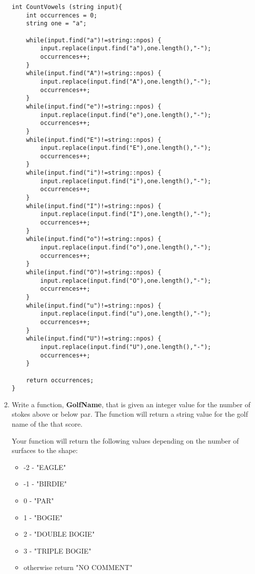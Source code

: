 \documentclass{article}
\begin{document}
\begin{enumerate}
\begin{lstlisting}
int CountVowels (string input){
    int occurrences = 0;
    string one = "a";

    while(input.find("a")!=string::npos) {
        input.replace(input.find("a"),one.length(),"-");
        occurrences++;
    }
    while(input.find("A")!=string::npos) {
        input.replace(input.find("A"),one.length(),"-");
        occurrences++;
    }
    while(input.find("e")!=string::npos) {
        input.replace(input.find("e"),one.length(),"-");
        occurrences++;
    }
    while(input.find("E")!=string::npos) {
        input.replace(input.find("E"),one.length(),"-");
        occurrences++;
    }
    while(input.find("i")!=string::npos) {
        input.replace(input.find("i"),one.length(),"-");
        occurrences++;
    }
    while(input.find("I")!=string::npos) {
        input.replace(input.find("I"),one.length(),"-");
        occurrences++;
    }
    while(input.find("o")!=string::npos) {
        input.replace(input.find("o"),one.length(),"-");
        occurrences++;
    }
    while(input.find("O")!=string::npos) {
        input.replace(input.find("O"),one.length(),"-");
        occurrences++;
    }
    while(input.find("u")!=string::npos) {
        input.replace(input.find("u"),one.length(),"-");
        occurrences++;
    }
    while(input.find("U")!=string::npos) {
        input.replace(input.find("U"),one.length(),"-");
        occurrences++;
    }

    return occurrences;
}
\end{lstlisting}

	\item Write a function, \textbf{GolfName}, that is given an integer value for the number of stokes above or below par.  The function will return a string value for the golf name of the that score.

Your function will return the following values depending on the number of surfaces to the shape:
\begin{itemize}
	\item -2 - "EAGLE"
	\item -1 - "BIRDIE"
	\item 0 - "PAR"
	\item 1 - "BOGIE"
	\item 2 - "DOUBLE BOGIE"
	\item 3 - "TRIPLE BOGIE"
	\item otherwise return "NO COMMENT"
\end{itemize}
   

\end{enumerate}
\end{document}
